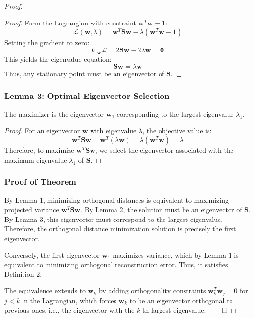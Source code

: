 \documentclass{article}
\begin{document}
\begin{proof}
\begin{proof}
Form the Lagrangian with constraint $\mathbf{w}^T\mathbf{w}=1$:
\begin{equation*}
    \mathcal{L}(\mathbf{w}, \lambda) = \mathbf{w}^T\mathbf{S}\mathbf{w} - \lambda(\mathbf{w}^T\mathbf{w} - 1)
\end{equation*}
Setting the gradient to zero:
\begin{equation*}
    \nabla_{\mathbf{w}}\mathcal{L} = 2\mathbf{S}\mathbf{w} - 2\lambda\mathbf{w} = \mathbf{0}
\end{equation*}
This yields the eigenvalue equation:
\begin{equation*}
    \boxed{\mathbf{S}\mathbf{w} = \lambda\mathbf{w}}
\end{equation*}
Thus, any stationary point must be an eigenvector of $\mathbf{S}$.
\end{proof}

\subsubsection*{Lemma 3: Optimal Eigenvector Selection}
The maximizer is the eigenvector $\mathbf{w}_1$ corresponding to the largest eigenvalue $\lambda_1$.

\begin{proof}
For an eigenvector $\mathbf{w}$ with eigenvalue $\lambda$, the objective value is:
\begin{equation*}
    \mathbf{w}^T\mathbf{S}\mathbf{w} = \mathbf{w}^T(\lambda\mathbf{w}) = \lambda(\mathbf{w}^T\mathbf{w}) = \lambda
\end{equation*}
Therefore, to maximize $\mathbf{w}^T\mathbf{S}\mathbf{w}$, we select the eigenvector associated with the maximum eigenvalue $\lambda_1$ of $\mathbf{S}$.
\end{proof}

\subsubsection*{Proof of Theorem}
By Lemma 1, minimizing orthogonal distances is equivalent to maximizing projected variance $\mathbf{w}^T\mathbf{S}\mathbf{w}$. By Lemma 2, the solution must be an eigenvector of $\mathbf{S}$. By Lemma 3, this eigenvector must correspond to the largest eigenvalue. Therefore, the orthogonal distance minimization solution is precisely the first eigenvector.

Conversely, the first eigenvector $\mathbf{w}_1$ maximizes variance, which by Lemma 1 is equivalent to minimizing orthogonal reconstruction error. Thus, it satisfies Definition 2.

The equivalence extends to $\mathbf{w}_k$ by adding orthogonality constraints $\mathbf{w}_k^T\mathbf{w}_j = 0$ for $j < k$ in the Lagrangian, which forces $\mathbf{w}_k$ to be an eigenvector orthogonal to previous ones, i.e., the eigenvector with the $k$-th largest eigenvalue. $\qed$
\end{proof}
\end{document}
